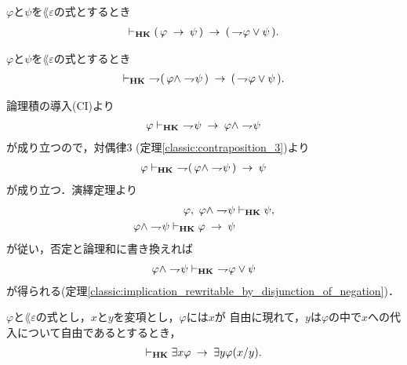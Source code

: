 	\begin{screen}
		\begin{thm}[含意は否定と論理和で表せる]
		\label{classic:implication_rewritable_by_disjunction_of_negation}
			$\varphi$と$\psi$を$\lang{\varepsilon}$の式とするとき
			\begin{align}
				\vdash_{{\scriptsize \mbox{{\bf HK}}}} (\, \varphi \hspace{0.25em}\rightarrow\hspace{0.25em} \psi\, )
				\hspace{0.25em}\rightarrow\hspace{0.25em} (\, \rightharpoondown\hspace{-0.25em} \varphi \vee \psi\, ).
			\end{align}
		\end{thm}
	\end{screen}
	
	\begin{screen}
		\begin{thm}[De Morganの法則2]
		\label{classic:De_Morgan_law_2}
			$\varphi$と$\psi$を$\lang{\varepsilon}$の式とするとき
			\begin{align}
				\provable{\mbox{{\bf HK}}}\ 
				\negation (\, \varphi \wedge \negation \psi\, )
				\rarrow (\, \negation \varphi \vee \psi\, ).
			\end{align}
		\end{thm}
	\end{screen}
	
	\begin{sketch}
		論理積の導入(CI)より
		\begin{align}
			\varphi \vdash_{{\scriptsize \mbox{{\bf HK}}}}\ \rightharpoondown\hspace{-0.25em} \psi
			\hspace{0.25em}\rightarrow\hspace{0.25em} \varphi \wedge \rightharpoondown\hspace{-0.25em} \psi
		\end{align}
		が成り立つので，対偶律3 (定理\ref{classic:contraposition_3})より
		\begin{align}
			\varphi \provable{\mbox{{\bf HK}}}\ 
			\negation (\, \varphi \wedge \negation \psi\, ) \rarrow \psi
		\end{align}
		が成り立つ．演繹定理より
		\begin{align}
			\varphi,\ \varphi \wedge \rightharpoondown\hspace{-0.25em} \psi &\vdash_{{\scriptsize \mbox{{\bf HK}}}}
			\psi, \\
			\varphi \wedge \rightharpoondown\hspace{-0.25em} \psi \vdash_{{\scriptsize \mbox{{\bf HK}}}}
			\varphi \hspace{0.25em}\rightarrow\hspace{0.25em} \psi
		\end{align}
		が従い，否定と論理和に書き換えれば
		\begin{align}
			\varphi \wedge \rightharpoondown\hspace{-0.25em} \psi \vdash_{{\scriptsize \mbox{{\bf HK}}}}
			\ \rightharpoondown\hspace{-0.25em} \varphi \vee \psi
		\end{align}
		が得られる(定理\ref{classic:implication_rewritable_by_disjunction_of_negation})．
		\QED
	\end{sketch}
	
	\begin{screen}
		\begin{thm}
			$\varphi$と$\lang{\varepsilon}$の式とし，$x$と$y$を変項とし，$\varphi$には$x$が
			自由に現れて，$y$は$\varphi$の中で$x$への代入について自由であるとするとき，
			\begin{align}
				\vdash_{{\scriptsize \mbox{{\bf HK}}}} \exists x \varphi \hspace{0.25em}\rightarrow\hspace{0.25em} \exists y \varphi(x/y).
			\end{align}
		\end{thm}
	\end{screen}
	
